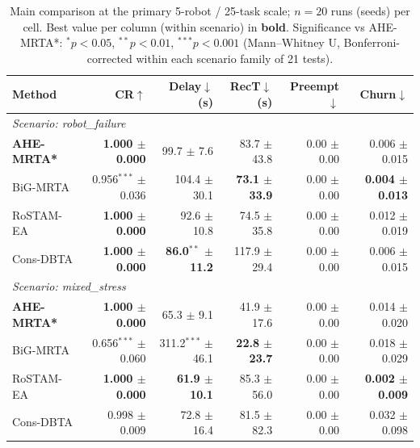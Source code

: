 \begin{table}[t]
\centering
\caption{Main comparison at the primary 5-robot / 25-task scale; $n{=}20$ runs (seeds) per cell. Best value per column (within scenario) in \textbf{bold}. Significance vs AHE-MRTA*: $^{*}p{<}0.05$, $^{**}p{<}0.01$, $^{***}p{<}0.001$ (Mann--Whitney U, Bonferroni-corrected within each scenario family of 21 tests).}
\label{tab:main_comparison}
\small
\setlength{\tabcolsep}{3pt}
\begin{tabular}{lrrrrr}
\toprule
\textbf{Method} & \textbf{CR$\uparrow$} & \textbf{Delay$\downarrow$(s)} & \textbf{RecT$\downarrow$(s)} & \textbf{Preempt$\downarrow$} & \textbf{Churn$\downarrow$} \\
\midrule
\multicolumn{6}{l}{\textit{Scenario: robot\_failure}} \\
\textbf{AHE-MRTA*} & \textbf{1.000 $\pm$ 0.000} & 99.7 $\pm$ 7.6 & 83.7 $\pm$ 43.8 & 0.00 $\pm$ 0.00 & 0.006 $\pm$ 0.015 \\
BiG-MRTA & 0.956$^{***}$ $\pm$ 0.036 & 104.4 $\pm$ 30.1 & \textbf{73.1 $\pm$ 33.9} & 0.00 $\pm$ 0.00 & \textbf{0.004 $\pm$ 0.013} \\
RoSTAM-EA & \textbf{1.000 $\pm$ 0.000} & 92.6 $\pm$ 10.8 & 74.5 $\pm$ 35.8 & 0.00 $\pm$ 0.00 & 0.012 $\pm$ 0.019 \\
Cons-DBTA & \textbf{1.000 $\pm$ 0.000} & \textbf{86.0$^{**}$ $\pm$ 11.2} & 117.9 $\pm$ 29.4 & 0.00 $\pm$ 0.00 & 0.006 $\pm$ 0.015 \\
\midrule
\multicolumn{6}{l}{\textit{Scenario: mixed\_stress}} \\
\textbf{AHE-MRTA*} & \textbf{1.000 $\pm$ 0.000} & 65.3 $\pm$ 9.1 & 41.9 $\pm$ 17.6 & 0.00 $\pm$ 0.00 & 0.014 $\pm$ 0.020 \\
BiG-MRTA & 0.656$^{***}$ $\pm$ 0.060 & 311.2$^{***}$ $\pm$ 46.1 & \textbf{22.8 $\pm$ 23.7} & 0.00 $\pm$ 0.00 & 0.018 $\pm$ 0.029 \\
RoSTAM-EA & \textbf{1.000 $\pm$ 0.000} & \textbf{61.9 $\pm$ 10.1} & 85.3 $\pm$ 56.0 & 0.00 $\pm$ 0.00 & \textbf{0.002 $\pm$ 0.009} \\
Cons-DBTA & 0.998 $\pm$ 0.009 & 72.8 $\pm$ 16.4 & 81.5 $\pm$ 82.3 & 0.00 $\pm$ 0.00 & 0.032 $\pm$ 0.098 \\
\bottomrule
\end{tabular}
\end{table}

